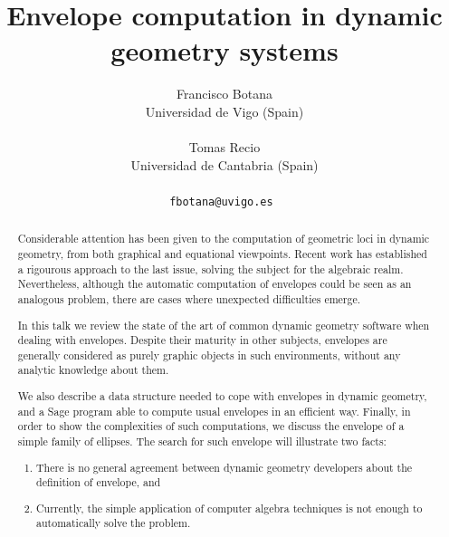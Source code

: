 \documentclass[a4paper]{article} %
\date{} %
\def\titulo#1{\title{#1}} %
\def\autores#1{\author{#1}} %
\begin{document}
\titulo{Envelope computation in dynamic geometry systems}

\autores{Francisco Botana \\ %
       Universidad de Vigo (Spain) \\ \\ %
       Tomas Recio \\ %
       Universidad de Cantabria (Spain) \\ \\ %
       \tt{fbotana@uvigo.es} %
       }%


\maketitle

\thispagestyle{empty}




\begin{abstract}
Considerable attention has been given to the computation of geometric loci in dynamic geometry, from both graphical and equational viewpoints. Recent work has established a rigourous approach to the last issue, solving the subject for the algebraic realm. 
Nevertheless, although the automatic computation of envelopes could be seen as an analogous problem, there are cases where unexpected difficulties emerge.

In this talk we review the state of the art of common dynamic geometry software when dealing with envelopes. Despite their maturity in other subjects, envelopes are generally considered as purely graphic objects in such environments, without any analytic knowledge about them.

We also describe a data structure needed to cope with envelopes in dynamic geometry, and a Sage program able to compute usual envelopes in an efficient way. Finally, in order to show the complexities of such computations, we discuss the envelope of a simple family of ellipses. The search for such envelope will illustrate two facts:
\begin{enumerate}
 \item There is no general agreement between dynamic geometry developers about the definition of envelope, and
 \item Currently, the simple application of computer algebra techniques is not enough to automatically solve the problem. 
\end{enumerate}



\end{abstract}
\end{document}
